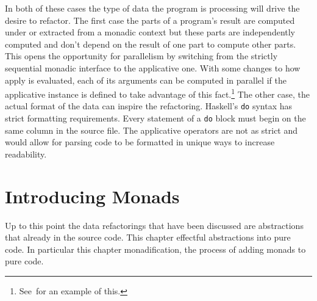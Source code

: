 In both of these cases the type of data the program is processing will drive the desire to refactor. The first case the parts of a program's result are computed under or extracted from a monadic context but these parts are independently computed and don't depend on the result of one part to compute other parts. This opens the opportunity for parallelism by switching from the strictly sequential monadic interface to the applicative one. With some changes to how apply is evaluated, each of its arguments can be computed in parallel if the applicative instance is defined to take advantage of this fact.\footnote{See~\DIFdelbegin {}\DIFdelend \DIFaddbegin {}\DIFaddend for an example of this.} The other case, the actual format of the data can inspire the refactoring. Haskell's \texttt{do} syntax has strict formatting requirements. Every statement of a \texttt{do} block must begin on the same column in the source file. The applicative operators are not as strict and would allow for parsing code to be formatted in unique ways to increase readability. 

\DIFaddbegin {}\texttt{}  \texttt{} 

   

\DIFaddend \chapter{Introducing Monads}
\label{chp:monadification}

Up to this point the data refactorings that have been discussed are \DIFdelbegin {}\DIFdelend \DIFaddbegin {}\DIFaddend abstractions that already \DIFdelbegin {}\DIFdelend \DIFaddbegin {}\DIFaddend in the source code. This chapter \DIFdelbegin {}\DIFdelend \DIFaddbegin {}\textit{} \DIFaddend effectful abstractions into pure code. In particular this chapter \DIFdelbegin {}\DIFdelend \DIFaddbegin {}\DIFaddend monadification, the process of adding monads to pure code. 

